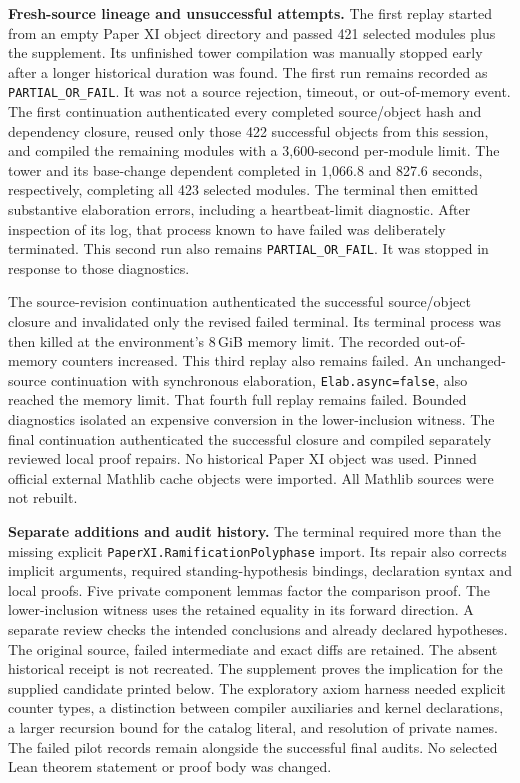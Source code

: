 \textbf{Fresh-source lineage and unsuccessful attempts.}
The first replay started from an empty Paper XI object directory and passed
421 selected modules plus the supplement. Its unfinished tower compilation
was manually stopped early after a longer historical duration was found.
The first run remains recorded as \texttt{PARTIAL\_OR\_FAIL}. It was not a
source rejection, timeout, or out-of-memory event.
The first continuation authenticated every completed source/object hash and
dependency closure, reused only those 422 successful objects from this
session, and compiled the remaining modules with a 3,600-second per-module
limit. The tower and its base-change dependent completed in
1,066.8 and 827.6 seconds, respectively, completing
all 423 selected modules. The terminal then emitted substantive elaboration
errors, including a heartbeat-limit diagnostic. After inspection of its log,
that process known to have failed was deliberately terminated. This second run also
remains \texttt{PARTIAL\_OR\_FAIL}. It was stopped in response to those diagnostics.

The source-revision continuation authenticated the successful source/object
closure and invalidated only the revised failed terminal. Its terminal process
was then killed at the environment's 8\,GiB memory limit. The recorded
out-of-memory counters increased. This third replay also remains failed.
An unchanged-source continuation with synchronous elaboration,
\texttt{Elab.async=false}, also reached the memory limit. That fourth full
replay remains failed. Bounded diagnostics isolated an expensive conversion
in the lower-inclusion witness. The final continuation authenticated the
successful closure and compiled separately reviewed local proof repairs.
No historical Paper XI object was used. Pinned official external Mathlib cache
objects were imported. All Mathlib sources were not rebuilt.

\textbf{Separate additions and audit history.}
The terminal required more than the missing explicit
\nolinkurl{PaperXI.RamificationPolyphase} import. Its repair also corrects
implicit arguments, required standing-hypothesis bindings, declaration syntax
and local proofs. Five private component lemmas factor the comparison proof.
The lower-inclusion witness uses the retained equality in its forward direction.
A separate review checks the intended conclusions and
already declared hypotheses. The original source, failed intermediate and
exact diffs are retained. The absent historical receipt is not recreated.
The supplement proves the implication for the supplied candidate printed below.
The exploratory axiom harness needed explicit counter types, a distinction
between compiler auxiliaries and kernel declarations, a larger recursion
bound for the catalog literal, and resolution of private names. The failed
pilot records remain alongside the successful final audits. No
selected Lean theorem statement or proof body was changed.

